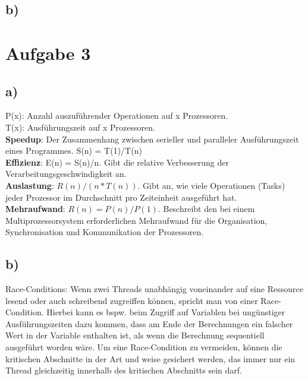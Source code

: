 \documentclass{article}
\begin{document}
	\subsection{b)}

    \section{Aufgabe 3}
    
        \subsection{a)}
        P(x): Anzahl auszuführender Operationen auf x Prozessoren.\\
        T(x): Ausführungszeit auf x Prozessoren.\\
        
        \textbf{Speedup}: Der Zusammenhang zwischen serieller und paralleler Ausführungszeit eines Programmes. S(n) = T(1)/T(n)\\
        
        \textbf{Effizienz}: E(n) = S(n)/n. Gibt die relative Verbesserung der Verarbeitungsgeschwindigkeit an.\\
        
        \textbf{Auslastung}: $ R(n)/(n*T(n)) $. Gibt an, wie viele Operationen (Tasks) jeder Prozessor im Durchschnitt pro Zeiteinheit ausgeführt hat.\\
        
        \textbf{Mehraufwand}: $R(n) = P(n)/P(1)$. Beschreibt den bei einem Multiprozessorsystem erforderlichen Mehraufwand für die Organisation, Synchronisation und Kommunikation der Prozessoren.\\
        
        \subsection{b)}
        Race-Conditions: Wenn zwei Threads unabhängig voneinander auf eine Ressource lesend oder auch schreibend zugreiffen können, 
        spricht man von einer Race-Condition. Hierbei kann es bspw. beim Zugriff auf Variablen bei ungünstiger Ausführungszeiten
        dazu kommen, dass am Ende der Berechnungen ein falscher Wert in der Variable enthalten ist, als wenn die Berechnung sequentiell 
        ausgeführt worden wäre.
        Um eine Race-Condition zu vermeiden, können die kritischen Abschnitte in der Art und weise gesichert werden, das immer nur ein 
        Thread gleichzeitig innerhalb des kritischen Abschnitts sein darf.
\end{document}
